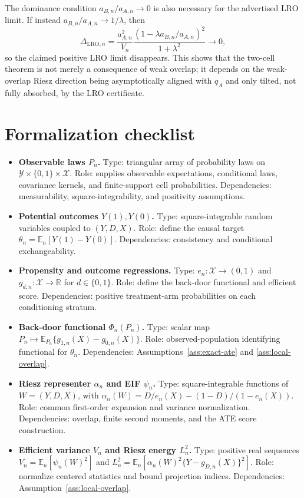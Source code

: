 \documentclass[11pt]{article}
\newcommand{\E}{\mathbb{E}}
\newcommand{\R}{\mathbb{R}}
\theoremstyle{definition}
\theoremstyle{plain}
\theoremstyle{remark}
\begin{document}
The dominance condition \(a_{B,n}/a_{A,n}\to0\) is also necessary for the advertised LRO limit.  If instead \(a_{B,n}/a_{A,n}\to1/\lambda\), then
\[
  \Delta_{\mathrm{LRO},n}
  =
  \frac{a_{A,n}^2}{V_n}
  \frac{(1-\lambda a_{B,n}/a_{A,n})^2}{1+\lambda^2}
  \to0,
\]
so the claimed positive LRO limit disappears.  This shows that the two-cell theorem is not merely a consequence of weak overlap; it depends on the weak-overlap Riesz direction being asymptotically aligned with \(q_A\) and only tilted, not fully absorbed, by the LRO certificate.

\section{Formalization checklist}
\begin{itemize}[leftmargin=*]
  \item \textbf{Observable laws \(P_n\).}  Type: triangular array of probability laws on \(\mathcal Y\times\{0,1\}\times\mathcal X\).  Role: supplies observable expectations, conditional laws, covariance kernels, and finite-support cell probabilities.  Dependencies: measurability, square-integrability, and positivity assumptions.
  \item \textbf{Potential outcomes \(Y(1),Y(0)\).}  Type: square-integrable random variables coupled to \((Y,D,X)\).  Role: define the causal target \(\theta_n=\E_n[Y(1)-Y(0)]\).  Dependencies: consistency and conditional exchangeability.
  \item \textbf{Propensity and outcome regressions.}  Type: \(e_n:\mathcal X\to(0,1)\) and \(g_{d,n}:\mathcal X\to\R\) for \(d\in\{0,1\}\).  Role: define the back-door functional and efficient score.  Dependencies: positive treatment-arm probabilities on each conditioning stratum.
  \item \textbf{Back-door functional \(\Phi_n(P_n)\).}  Type: scalar map \(P_n\mapsto\E_{P_n}\{g_{1,n}(X)-g_{0,n}(X)\}\).  Role: observed-population identifying functional for \(\theta_n\).  Dependencies: Assumptions~\ref{ass:exact-ate} and \ref{ass:local-overlap}.
  \item \textbf{Riesz representer \(\alpha_n\) and EIF \(\psi_n\).}  Type: square-integrable functions of \(W=(Y,D,X)\), with \(\alpha_n(W)=D/e_n(X)-(1-D)/(1-e_n(X))\).  Role: common first-order expansion and variance normalization.  Dependencies: overlap, finite second moments, and the ATE score construction.
  \item \textbf{Efficient variance \(V_n\) and Riesz energy \(L_n^2\).}  Type: positive real sequences \(V_n=\E_n[\psi_n(W)^2]\) and \(L_n^2=\E_n[\alpha_n(W)^2\{Y-g_{D,n}(X)\}^2]\).  Role: normalize centered statistics and bound projection indices.  Dependencies: Assumption~\ref{ass:local-overlap}.

\end{itemize}
\end{document}
